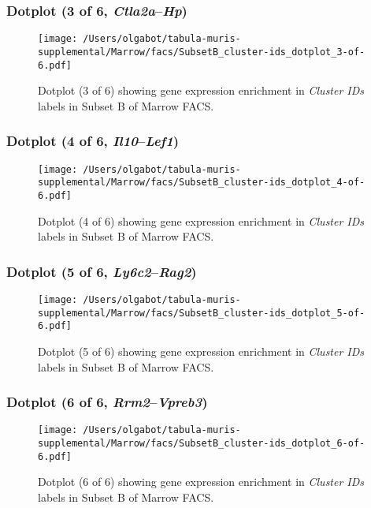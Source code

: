 \clearpage

\subsubsection{Dotplot (3 of 6, \emph{Ctla2a}--\emph{Hp})}
\begin{figure}[h]
\centering
\texttt{[image: /Users/olgabot/tabula-muris-supplemental/Marrow/facs/SubsetB\_cluster-ids\_dotplot\_3-of-6.pdf]}

\caption{ Dotplot (3 of 6)  showing gene expression enrichment in \emph{Cluster IDs} labels in Subset B of Marrow FACS. }
\end{figure}


\clearpage

\subsubsection{Dotplot (4 of 6, \emph{Il10}--\emph{Lef1})}
\begin{figure}[h]
\centering
\texttt{[image: /Users/olgabot/tabula-muris-supplemental/Marrow/facs/SubsetB\_cluster-ids\_dotplot\_4-of-6.pdf]}

\caption{ Dotplot (4 of 6)  showing gene expression enrichment in \emph{Cluster IDs} labels in Subset B of Marrow FACS. }
\end{figure}


\clearpage

\subsubsection{Dotplot (5 of 6, \emph{Ly6c2}--\emph{Rag2})}
\begin{figure}[h]
\centering
\texttt{[image: /Users/olgabot/tabula-muris-supplemental/Marrow/facs/SubsetB\_cluster-ids\_dotplot\_5-of-6.pdf]}

\caption{ Dotplot (5 of 6)  showing gene expression enrichment in \emph{Cluster IDs} labels in Subset B of Marrow FACS. }
\end{figure}


\clearpage

\subsubsection{Dotplot (6 of 6, \emph{Rrm2}--\emph{Vpreb3})}
\begin{figure}[h]
\centering
\texttt{[image: /Users/olgabot/tabula-muris-supplemental/Marrow/facs/SubsetB\_cluster-ids\_dotplot\_6-of-6.pdf]}

\caption{ Dotplot (6 of 6)  showing gene expression enrichment in \emph{Cluster IDs} labels in Subset B of Marrow FACS. }
\end{figure}


